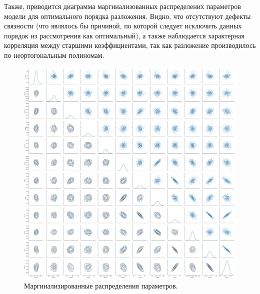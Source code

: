 \documentclass{matmex-diploma-custom}
\begin{document}
\pagebreak

Также, приводится диаграмма маргинализованных распределених параметров модели для оптимального порядка разложения. Видно, что отсутствуют дефекты связности (что являлось бы причиной, по которой следует исключить данных порядок из рассмотрения как оптимальный), а также наблюдается характерная корреляция между старшими коэффициентами, так как разложение производилось по неортогональным полиномам.
\begin{figure}[h!!]
\begin{center}
\begin{minipage}[h!!]{0.95\linewidth}
        \includegraphics[width=1.0\textwidth]{../imgs/pairplot.png}
\end{minipage}
\caption{Маргинализированные распределения параметров.}
\end{center}
\end{figure}



\pagebreak
\end{document}
